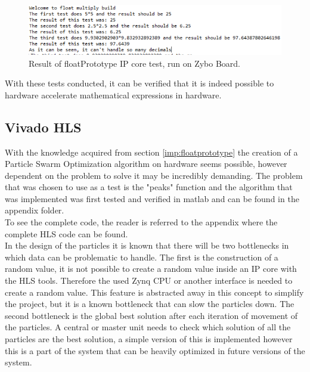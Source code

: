 \begin{figure}[H]
	\centering
	\includegraphics[trim={0 4 0 0},clip,width=0.8\linewidth]{diagram/floatMultiply}
	\caption{Result of floatPrototype IP core test, run on Zybo Board.}
	\label{fig:floatmultiply}
\end{figure}


With these tests conducted, it can be verified that it is indeed possible to hardware accelerate mathematical expressions in hardware.

\clearpage
\subsection{Vivado HLS}
With the knowledge acquired from section \ref{imp:floatprototype}  the creation of a Particle Swarm Optimization algorithm on hardware seems possible, however dependent on the problem to solve it may be incredibly demanding. The problem that was chosen to use as a test is the "peaks" function and the algorithm that was implemented was first tested and verified in matlab and can be found in the appendix folder.\\

To see the complete code, the reader is referred to the appendix where the complete HLS code can be found.\\

In the design of the particles it is known that there will be two bottlenecks in which data can be problematic to handle. The first is the construction of a random value, it is not possible to create a random value inside an IP core with the HLS tools. Therefore the used Zynq CPU or another interface is needed to create a random value. This feature is abstracted away in this concept to simplify the project, but it is a known bottleneck that can slow the particles down. The second bottleneck is the global best solution after each iteration of movement of the particles. A central or master unit needs to check which solution of all the particles are the best solution, a simple version of this is implemented however this is a part of the system that can be heavily optimized in future versions of the system.\\

